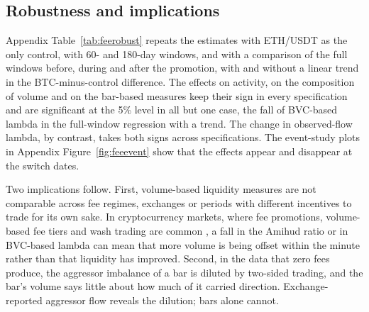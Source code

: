 \begin{table}[t]
\centering\caption{Bitcoin pairs by fee regime}\label{tab:pairs}
\resizebox{\textwidth}{!}{}
\end{table}

\subsection{Robustness and implications}

Appendix Table~\ref{tab:feerobust} repeats the estimates with ETH/USDT as the only control, with 60-
and 180-day windows, and with a comparison of the full windows before, during and after the
promotion, with and without a linear trend in the BTC-minus-control difference. The effects on
activity, on the composition of volume and on the bar-based measures keep their sign in every
specification and are significant at the 5\% level in all but one case, the fall of BVC-based lambda
in the full-window regression with a trend. The change in observed-flow lambda, by contrast, takes
both signs across specifications. The event-study plots in Appendix Figure~\ref{fig:feeevent} show
that the effects appear and disappear at the switch dates.

Two implications follow. First, volume-based liquidity measures are not comparable across fee
regimes, exchanges or periods with different incentives to trade for its own sake. In
cryptocurrency markets, where fee promotions, volume-based fee tiers and wash trading are common
\citep{cong2023,amiram2025}, a fall in the Amihud ratio or in BVC-based lambda can mean that more
volume is being offset within the minute rather than that liquidity has improved. Second, in the
data that zero fees produce, the aggressor imbalance of a bar is diluted by two-sided trading, and
the bar's volume says little about how much of it carried direction. Exchange-reported aggressor
flow reveals the dilution; bars alone cannot.
